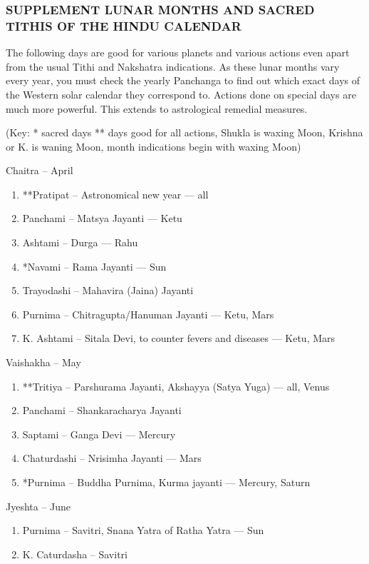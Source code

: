 \begin{enumerate}
\begin{enumerate}
 


\subsubsection{SUPPLEMENT
LUNAR MONTHS AND SACRED TITHIS OF THE HINDU CALENDAR}
 

The following days are good for various planets and various actions even apart from the usual Tithi and Nakshatra indications. As these lunar months vary every year, you must check the yearly Panchanga to find out which exact days of the Western solar calendar they correspond to. Actions done on special days are much more powerful. This extends to astrological remedial measures.

(Key:  * sacred days    ** days good for all actions, Shukla is waxing Moon, Krishna or K. is waning Moon, month indications begin with waxing Moon)

 

Chaitra – April

 
\begin{enumerate} 
\item[] **Pratipat – Astronomical new year  — all
\item[] Panchami – Matsya  Jayanti — Ketu
\item[] Ashtami – Durga — Rahu
\item[] *Navami – Rama Jayanti — Sun
\item[] Trayodashi – Mahavira (Jaina) Jayanti
\item[] Purnima – Chitragupta/Hanuman Jayanti — Ketu, Mars
\item[] K. Ashtami – Sitala Devi, to counter fevers and diseases — Ketu, Mars
\end{enumerate}
 

Vaishakha – May
\begin{enumerate} 
\item[] **Tritiya – Parshurama Jayanti, Akshayya (Satya Yuga) — all, Venus
\item[] Panchami – Shankaracharya Jayanti
\item[] Saptami – Ganga Devi — Mercury
\item[] Chaturdashi – Nrisimha Jayanti — Mars
\item[] *Purnima – Buddha Purnima, Kurma jayanti — Mercury, Saturn
 \end{enumerate}

Jyeshta – June
\begin{enumerate} 
\item[] Purnima – Savitri, Snana Yatra of Ratha Yatra — Sun
\item[] K. Caturdasha – Savitri
 \end{enumerate}


\end{enumerate}
\end{enumerate}
